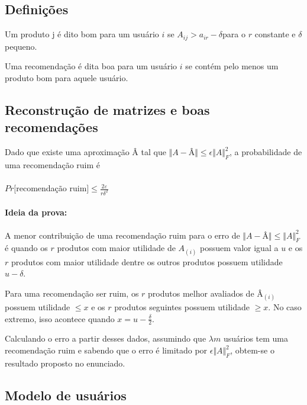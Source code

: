 \documentclass[a4paper,10pt]{article}
\begin{document}
\subsection{Definições}

\begin{definicao} \label{definicao:box} Um produto j é dito bom para um usuário $i$ se $A_{ij} > a_{ir} - \delta$para o $r$ constante e $\delta$ pequeno.
\end{definicao}
\begin{definicao} \label{definicao:box}Uma recomendação é dita boa para um usuário $i$ se contém pelo menos um produto bom para aquele usuário.
\end{definicao}

\subsection{Reconstrução de matrizes e boas recomendações}

\begin{lema} \label{lema:box}
Dado que existe uma aproximação Â tal que $\Vert A - $Â$ \Vert \le \epsilon \Vert A \Vert^2_F$, a probabilidade de uma recomenda\c{c}\~ao
ruim é 
\\ \\ 
$Pr [ $recomendação ruim$ ] \leq \frac{2\varepsilon}{r\delta^2}$

\end{lema}

\paragraph{Ideia da prova:}
  
A menor contribuição de uma recomendação ruim para o erro de $\Vert A - 
$Â$ \Vert \le \Vert A \Vert^2_F$ é quando os $r$ produtos com maior utilidade 
de $A_{(i)}$ possuem valor igual a $u$ e os $r$ produtos com maior utilidade
dentre os outros produtos possuem utilidade $u - \delta$.
 
Para uma recomendação ser ruim, os $r$ produtos melhor avaliados de Â$_{(i)}$
possuem utilidade $\leq x$ e os $r$ produtos seguintes possuem utilidade
$\geq x$. No caso extremo, isso acontece quando $x = u - \frac{\delta}{2}$. 

Calculando o erro a partir desses dados, assumindo que $\lambda m$ usuários
tem uma recomendação ruim e sabendo que o erro é limitado por $\epsilon \Vert
A \Vert^2_F$, obtem-se o resultado proposto no enunciado.

\subsection{Modelo de usuários}
\end{document}
